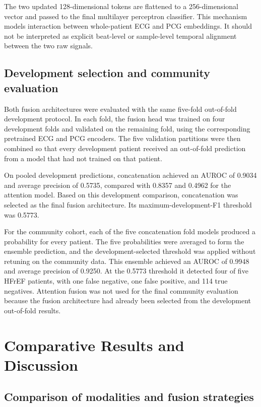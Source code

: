 \documentclass[11pt,a4paper]{article}
\begin{document}
The two updated 128-dimensional tokens are flattened to a 256-dimensional
vector and passed to the final multilayer perceptron classifier. This mechanism
models interaction between whole-patient ECG and PCG embeddings. It should not
be interpreted as explicit beat-level or sample-level temporal alignment
between the two raw signals.

\subsection{Development selection and community evaluation}
Both fusion architectures were evaluated with the same five-fold
out-of-fold development protocol. In each fold, the fusion head was trained on
four development folds and validated on the remaining fold, using the
corresponding pretrained ECG and PCG encoders. The five validation partitions
were then combined so that every development patient received an out-of-fold
prediction from a model that had not trained on that patient.

On pooled development predictions, concatenation achieved an AUROC of 0.9034
and average precision of 0.5735, compared with 0.8357 and 0.4962 for the
attention model. Based on this development comparison, concatenation was
selected as the final fusion architecture. Its maximum-development-F1
threshold was 0.5773.

For the community cohort, each of the five concatenation fold models produced
a probability for every patient. The five probabilities were averaged to form
the ensemble prediction, and the development-selected threshold was applied
without retuning on the community data. This ensemble achieved an AUROC of
0.9948 and average precision of 0.9250. At the 0.5773 threshold it detected
four of five HFrEF patients, with one false negative, one false positive, and
114 true negatives. Attention fusion was not used for the final community
evaluation because the fusion architecture had already been selected from the
development out-of-fold results.

\section{Comparative Results and Discussion}
\label{sec:comparison}

\subsection{Comparison of modalities and fusion strategies}
\end{document}
